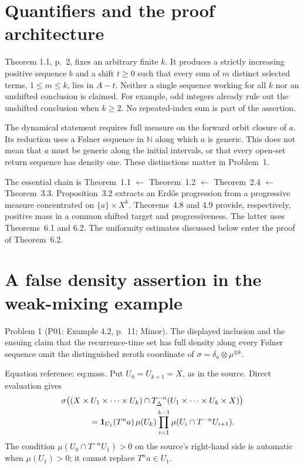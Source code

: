 \documentclass[10pt]{article}
\begin{document}
\section*{Quantifiers and the proof architecture}
Theorem 1.1, p. 2, fixes an arbitrary finite \(k\). It produces a strictly increasing positive sequence \(b\) and a shift \(t\geq0\) such that every sum of \(m\) distinct selected terms, \(1\leq m\leq k\), lies in \(A-t\). Neither a single sequence working for all \(k\) nor an unshifted conclusion is claimed. For example, odd integers already rule out the unshifted conclusion when \(k\geq2\). No repeated-index sum is part of the assertion.\par
The dynamical statement requires full measure on the forward orbit closure of \(a\). Its reduction uses a Følner sequence in \(\mathbb N\) along which \(a\) is generic. This does not mean that \(a\) must be generic along the initial intervals, or that every open-set return sequence has density one. These distinctions matter in Problem 1.\par
The essential chain is Theorem 1.1 \(\leftarrow\) Theorem 1.2 \(\leftarrow\) Theorem 2.4 \(\leftarrow\) Theorem 3.3. Proposition 3.2 extracts an Erdős progression from a progressive measure concentrated on \(\{a\}\times X^k\). Theorems 4.8 and 4.9 provide, respectively, positive mass in a common shifted target and progressiveness. The latter uses Theorems 6.1 and 6.2. The uniformity estimates discussed below enter the proof of Theorem 6.2.\par
\section*{A false density assertion in the weak-mixing example}
Problem 1 (P01: Example 4.2, p. 11; Minor).  The displayed inclusion and the ensuing claim that the recurrence-time set has full density along every Følner sequence omit the distinguished zeroth coordinate of \(\sigma=\delta_a\otimes\mu^{\otimes k}\).\par
Equation reference: eq:mass. Put \(U_0=U_{k+1}=X\), as in the source. Direct evaluation gives \[\begin{aligned}
&\sigma\bigl((X\times U_1\times\cdots\times U_k)
 \cap T_\Delta^{-n}(U_1\times\cdots\times U_k\times X)\bigr) \notag\\
&\hspace{12mm}=
 \mathbf 1_{U_1}(T^n a)\,\mu(U_k)
 \prod_{i=1}^{k-1}\mu(U_i\cap T^{-n}U_{i+1}). \end{aligned}\] The condition \(\mu(U_0\cap T^{-n}U_1)>0\) on the source’s right-hand side is automatic when \(\mu(U_1)>0\); it cannot replace \(T^n a\in U_1\).\par
\end{document}
